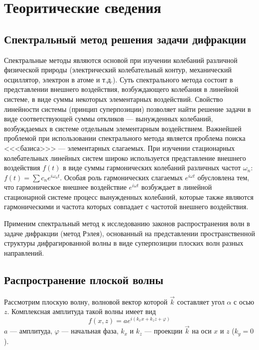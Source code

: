 \section{Теоритические сведения}
\subsection{Спектральный метод решения задачи дифракции}
Спектральные методы являются основой при изучении колебаний различной физической природы (электрический колебательный контур, механический осциллятор, электрон в атоме и т.д.). Суть спектрального метода состоит в представлении внешнего воздействия, возбуждающего колебания в линейной системе, в виде суммы некоторых элементарных воздействий. Свойство линейности системы (принцип
суперпозиции) позволяет найти решение задачи в виде соответствующей суммы откликов --- вынужденных колебаний, возбуждаемых в
системе отдельным элементарным воздействием. Важнейшей проблемой при использовании спектрального метода является проблема поиска <<<базиса>>> --- элементарных слагаемых. При изучении стационарных
колебательных линейных систем широко используется представление внешнего воздействия $f(t)$ в виде суммы гармонических колебаний различных частот $\omega_n$: $f(t) = \sum c_n e^{i\omega_n t}$. Особая роль гармонических слагаемых $e^{i\omega t}$ обусловлена тем, что гармоническое внешнее воздействие $e^{i\omega t}$ возбуждает в линейной стационарной системе процесс вынужденных колебаний, которые также являются гармоническими и частота которых совпадает с частотой внешнего воздействия.

Применим спектральный метод к исследованию законов распространения волн в задаче дифракции (метод Рэлея), основанный на представлении пространственной структуры дифрагированной волны в виде суперпозиции плоских волн разных направлений.

\subsection{Распространение плоской волны}
Рассмотрим плоскую волну, волновой вектор которой $\vec{k}$ составляет угол $\alpha$ с осью $z$. Комплексная амплитуда такой волны имеет вид
\[
f(x,z) = ae^{i(k_xx+k_zz+\varphi)}
\]
$a$ --- амплитуда, $\varphi$ --- начальная фаза, $k_x$ и $k_z$ --- проекции $\vec{k}$ на оси $x$ и $z$ ($k_y = 0$).

\begin{figure}[ht!]
\end{figure}

